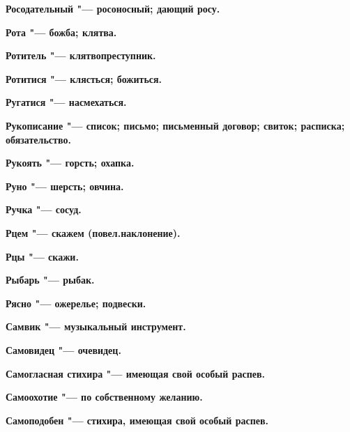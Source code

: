 \bfseries Росодательный \normalfont{} "--- росоносный; дающий росу. 




\bfseries Рота \normalfont{} "--- божба; клятва. 




\bfseries Ротитель \normalfont{} "--- клятвопреступник. 




\bfseries Ротитися \normalfont{} "--- клясться; божиться. 




\bfseries Ругатися \normalfont{} "--- насмехаться. 




\bfseries Рукописание \normalfont{} "--- список; письмо; письменный договор; свиток; расписка; обязательство. 




\bfseries Рукоять \normalfont{} "--- горсть; охапка. 




\bfseries Руно \normalfont{} "--- шерсть; овчина. 




\bfseries Ручка \normalfont{} "--- сосуд. 




\bfseries Рцем \normalfont{} "--- скажем (повел.наклонение). 




\bfseries Рцы \normalfont{} "--- скажи. 




\bfseries Рыбарь \normalfont{} "--- рыбак. 




\bfseries Рясно \normalfont{} "--- ожерелье; подвески. 




 





\bfseries Самвик \normalfont{} "--- музыкальный инструмент. 




\bfseries Самовидец \normalfont{} "--- очевидец. 




\bfseries Самогласная стихира \normalfont{} "--- имеющая свой особый распев. 




\bfseries Самоохотие \normalfont{} "--- по собственному желанию. 




\bfseries Самоподобен \normalfont{} "--- стихира, имеющая свой особый распев. 




